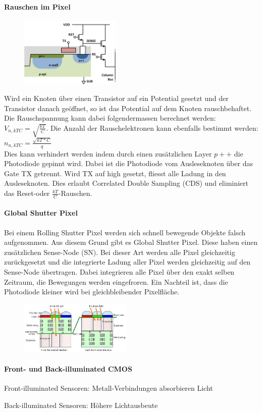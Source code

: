 \paragraph{Rauschen im Pixel}
\begin{figure}
    \vspace{-12pt}
    \centering
    \includegraphics[width=0.43\textwidth]{images/cmos_aps_pinned}
\end{figure}
Wird ein Knoten über einen Transistor auf ein Potential gesetzt und der Transistor danach geöffnet, so ist das Potential auf dem Knoten rauschbehaftet. Die Rauschspannung kann dabei folgendermassen berechnet werden: $V_{n, kTC} = \sqrt{\frac{kT}{C}}$. Die Anzahl der Rauschelektronen kann ebenfalls bestimmt werden: $n_{n, kTC} = \frac{\sqrt{kT*C}}{q}$ \\
Dies kann verhindert werden indem durch einen zusätzlichen Layer $p++$ die Photodiode gepinnt wird. Dabei ist die Photodiode vom Ausleseknoten über das Gate TX getrennt. Wird TX auf high gesetzt, fliesst alle Ladung in den Ausleseknoten. Dies erlaubt Correlated Double Sampling (CDS) und eliminiert das Reset-oder $\frac{kT}{C}$-Rauschen.

\paragraph{Global Shutter Pixel}
Bei einem Rolling Shutter Pixel werden sich schnell bewegende Objekte falsch aufgenommen. Aus diesem Grund gibt es Global Shutter Pixel. Diese haben einen zusätzlichen Sense-Node (SN). Bei dieser Art werden alle Pixel gleichzeitig zurückgesetzt und die integrierte Ladung aller Pixel werden gleichzeitig auf den Sense-Node übertragen. Dabei integrieren alle Pixel über den exakt selben Zeitraum, die Bewegungen werden eingefroren. Ein Nachteil ist, dass die Photodiode kleiner wird bei gleichbleibender Pixelfläche.

\begin{figure}
    \vspace{-12pt}
    \centering
    \includegraphics[width=0.48\textwidth]{images/cmos_iluminated}
\end{figure}
\paragraph{Front- und Back-illuminated CMOS}
\begin{compactitem}
    \item Front-illuminated Sensoren: Metall-Verbindungen absorbieren Licht 
    \item Back-illuminated Sensoren: Höhere Lichtausbeute
\end{compactitem}

